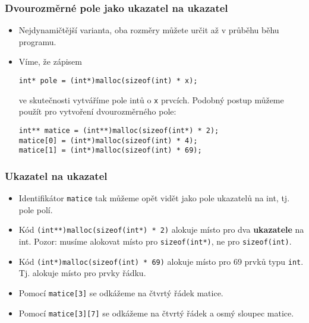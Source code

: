 \documentclass{beamer}
\newenvironment{itemizex}%
  {\large \begin{itemize}%
    \setlength{\itemsep}{8pt}%
    \setlength{\parskip}{8pt}}%
  {\end{itemize}}
\newenvironment{itemizey}%
  {\large \begin{itemize}%
    \setlength{\itemsep}{6pt}%
    \setlength{\parskip}{6pt}}%
  {\end{itemize}}
\begin{document}


\begin{frame}[t,fragile]\frametitle{Dvourozměrné pole jako ukazatel na ukazatel} 
    \begin{itemizex}
        \item Nejdynamičtější varianta, oba rozměry můžete určit až v průběhu běhu programu. 
        \item Víme, že zápisem
    \begin{verbatim} 
int* pole = (int*)malloc(sizeof(int) * x);
    \end{verbatim}
ve skutečnosti vytváříme pole intů o \texttt{x} prvcích. Podobný postup můžeme použít pro vytvoření dvourozměrného pole:
\begin{verbatim} 
int** matice = (int**)malloc(sizeof(int*) * 2);
matice[0] = (int*)malloc(sizeof(int) * 4);
matice[1] = (int*)malloc(sizeof(int) * 69);
\end{verbatim}
    \end{itemizex}
\end{frame}


\begin{frame}[t,fragile]\frametitle{Ukazatel na ukazatel} 
    \begin{itemizey}
        \item Identifikátor \texttt{matice} tak můžeme opět vidět jako pole ukazatelů na int, tj. pole polí.
        \item Kód \texttt{(int**)malloc(sizeof(int*) * 2)} alokuje místo pro dva \textbf{ukazatele} na int. Pozor: musíme alokovat místo pro \texttt{sizeof(int*)}, ne pro \texttt{sizeof(int)}.
        \item Kód \texttt{(int*)malloc(sizeof(int) * 69)} alokuje místo pro 69 prvků typu \texttt{int}. Tj. alokuje místo pro prvky řádku.
        \item Pomocí \texttt{matice[3]} se odkážeme na čtvrtý řádek matice. 
        \item Pomocí \texttt{matice[3][7]} se odkážeme na čtvrtý řádek a osmý sloupec matice. 
    \end{itemizey}
\end{frame}
\end{document}
